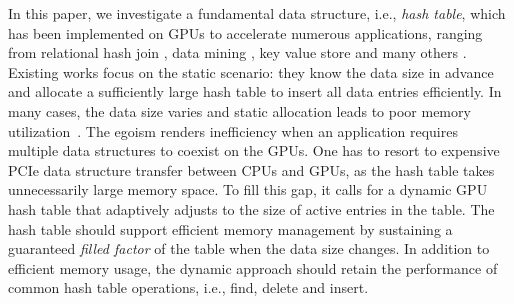 In this paper, we investigate a fundamental data structure, i.e., \emph{hash table}, which has been implemented on GPUs to accelerate numerous applications, ranging from relational hash join \cite{he2008relational,he2009relational,heimel2013hardware}, data mining \cite{pan2011fast,zhou2010parallel,zhong2014medusa},  key value store \cite{zhang2015mega,hetherington2015memcachedgpu,breslow2016horton} and many others \cite{bowers2010parallel,pan2010efficient,garcia2011coherent,niessner2013real,wu2015gpu}. Existing works \cite{alcantara2009real,zhang2015mega,hong2010mapcg,hetherington2015memcachedgpu,breslow2016horton} focus on the static scenario: they know the data size in advance and allocate a sufficiently large hash table to insert all data entries efficiently. In many cases, the data size varies and static allocation leads to poor memory utilization~\cite{ashkiani2018dynamic}. 
The egoism renders inefficiency when an application requires multiple data structures to coexist on the GPUs. One has to resort to expensive PCIe data structure transfer between CPUs and GPUs, as the hash table takes unnecessarily large memory space. 
To fill this gap, it calls for a dynamic GPU hash table that adaptively adjusts to the size of active entries in the table. The hash table should support efficient memory management by sustaining a guaranteed \emph{filled factor} of the table when the data size changes. 
In addition to efficient memory usage, the dynamic approach should retain the performance of common hash table operations, i.e., find, delete and insert.


